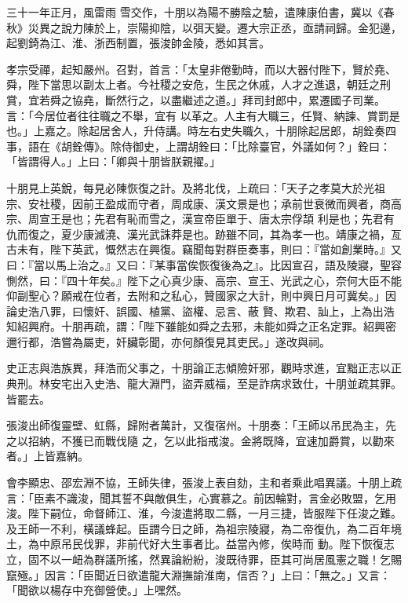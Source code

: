 \begin{pinyinscope}
 三十一年正月，風雷雨
 雪交作，十朋以為陽不勝陰之驗，遣陳康伯書，冀以《春秋》災異之說力陳於上，崇陽抑陰，以弭天變。遷大宗正丞，亟請祠歸。金犯邊，起劉錡為江、淮、浙西制置，張浚帥金陵，悉如其言。



 孝宗受禪，起知嚴州。召對，首言：「太皇非倦勤時，而以大器付陛下，賢於堯、舜，陛下當思以副太上者。今社稷之安危，生民之休戚，人才之進退，朝廷之刑賞，宜若舜之協堯，斷然行之，以盡繼述之道。」拜司封郎中，累遷國子司業。言：「今居位者往往職之不舉，宜有
 以革之。人主有大職三，任賢、納諫、賞罰是也。」上嘉之。除起居舍人，升侍講。時左右史失職久，十朋除起居郎，胡銓奏四事，語在《胡銓傳》。除侍御史，上謂胡銓曰：「比除臺官，外議如何？」銓曰：「皆謂得人。」上曰：「卿與十朋皆朕親擢。」



 十朋見上英銳，每見必陳恢復之計。及將北伐，上疏曰：「天子之孝莫大於光祖宗、安社稷，因前王盈成而守者，周成康、漢文景是也；承前世衰微而興者，商高宗、周宣王是也；先君有恥而雪之，漢宣帝臣單于、唐太宗俘頡
 利是也；先君有仇而復之，夏少康滅澆、漢光武誅莽是也。跡雖不同，其為孝一也。靖康之禍，亙古未有，陛下英武，慨然志在興復。竊聞每對群臣奏事，則曰：『當如創業時。』又曰：『當以馬上治之。』又曰：『某事當俟恢復後為之』。比因宣召，語及陵寢，聖容惻然，曰：『四十年矣。』陛下之心真少康、高宗、宣王、光武之心，奈何大臣不能仰副聖心？願戒在位者，去附和之私心，贊國家之大計，則中興日月可冀矣。」因論史浩八罪，曰懷奸、誤國、植黨、盜權、忌言、蔽
 賢、欺君、訕上，上為出浩知紹興府。十朋再疏，謂：「陛下雖能如舜之去邪，未能如舜之正名定罪。紹興密邇行都，浩嘗為屬吏，奸臟彰聞，亦何顏復見其吏民。」遂改與祠。



 史正志與浩族異，拜浩而父事之，十朋論正志傾險奸邪，觀時求進，宜黜正志以正典刑。林安宅出入史浩、龍大淵門，盜弄威福，至是詐病求致仕，十朋並疏其罪。皆罷去。



 張浚出師復靈壁、虹縣，歸附者萬計，又復宿州。十朋奏：「王師以吊民為主，先之以招納，不獲已而戰伐隨
 之，乞以此指戒浚。金將既降，宜速加爵賞，以勸來者。」上皆嘉納。



 會李顯忠、邵宏淵不協，王師失律，張浚上表自劾，主和者乘此唱異議。十朋上疏言：「臣素不識浚，聞其誓不與敵俱生，心實慕之。前因輪對，言金必敗盟，乞用浚。陛下嗣位，命督師江、淮，今浚遣將取二縣，一月三捷，皆服陛下任浚之難。及王師一不利，橫議蜂起。臣謂今日之師，為祖宗陵寢，為二帝復仇，為二百年境土，為中原吊民伐罪，非前代好大生事者比。益當內修，俟時而
 動。陛下恢復志立，固不以一衄為群議所搖，然異論紛紛，浚既待罪，臣其可尚居風憲之職！乞賜竄殛。」因言：「臣聞近日欲遣龍大淵撫諭淮南，信否？」上曰：「無之。」又言：「聞欲以楊存中充御營使。」上嘿然。




\end{pinyinscope}
